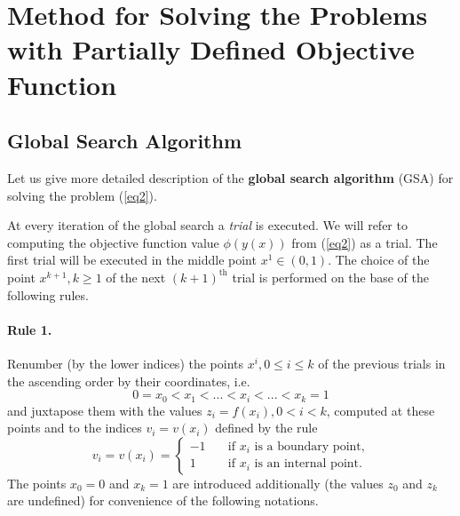 \documentclass[runningheads]{llncs}
\begin{document}
\section{Method for Solving the Problems with Partially Defined Objective Function}

\subsection{Global Search Algorithm}


Let us give more detailed description of the \textbf{global search algorithm} (GSA) for solving the problem (\ref{eq2}).

At every iteration of the global search a \textit{trial} is executed. We will refer to computing the objective function value  $\phi (y(x))$ from (\ref{eq2}) as a trial. The first trial will be executed in the middle point $x^1 \in (0,1)$. The choice of the point $x^{k+1}, k \geq 1$ of the next $(k+1)^\text{th}$ trial is performed on the base of the following rules.

\paragraph{Rule 1.} Renumber (by the lower indices) the points $x^i, 0 \leq i \leq k$  of the previous trials in the ascending order by their coordinates, i.e.
\begin{equation}\label{eq5} 
0=x_0 < x_1 < ... < x_i < ... < x_{k}=1
\end{equation}
and juxtapose them with the values $z_i=f(x_i), 0 < i < k$, computed at these points and to the indices $v_i=v(x_i)$ defined by the rule
\begin{equation}\label{eq6} 
v_i=v(x_i)=
  \begin{cases}
    -1 & {\quad \text{if } x_i \text{ is a boundary point,}}\\
    1  & {\quad \text{if } x_i \text{ is an internal point.}}
  \end{cases}
\end{equation}
The points $x_0=0$ and $x_{k}=1$ are introduced additionally (the values $z_0$ and $z_{k}$ are undefined) for convenience of the following notations.
\end{document}
